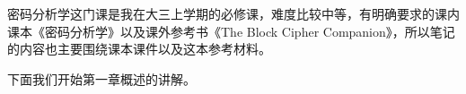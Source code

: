 \documentclass[12pt, a4paper, oneside]{ctexart}
\begin{document}
密码分析学这门课是我在大三上学期的必修课，难度比较中等，有明确要求的课内课本《密码分析学》以及课外参考书《The Block Cipher Companion》，所以笔记的内容也主要围绕课本课件以及这本参考材料。

下面我们开始第一章概述的讲解。
\end{document}
